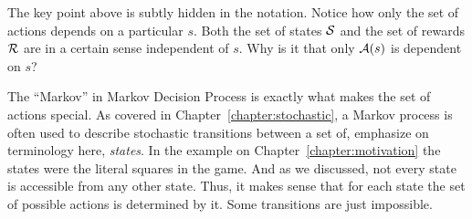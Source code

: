 The key point above is subtly hidden in the notation. Notice 
how only the set of actions depends on a particular $s$. Both 
the set of states $\mathcal{S}$ and the set of rewards $\mathcal{R}$ 
are in a certain sense independent of $s$. Why is it that only 
$\mathcal{A}(s)$ is dependent on $s$?

The ``Markov'' in Markov Decision Process is exactly what makes 
the set of actions special. As covered in 
Chapter~\ref{chapter:stochastic}, a Markov process is often 
used to describe stochastic transitions between a set of, 
emphasize on terminology here, \textit{states}. In the example 
on Chapter~\ref{chapter:motivation} the states were the literal 
squares in the game. And as we discussed, not every state is 
accessible from any other state. Thus, it makes sense that for 
each state the set of possible actions is determined by it. 
Some transitions are just impossible.
